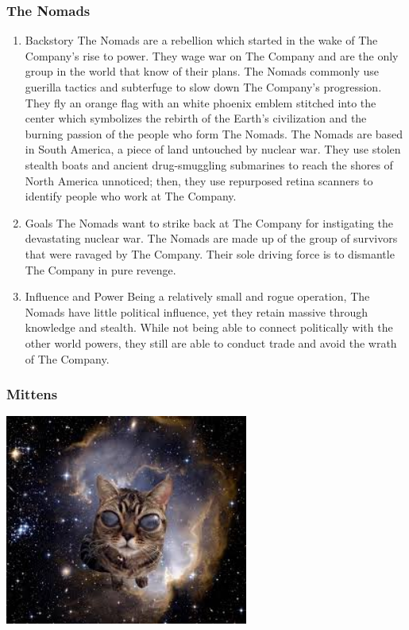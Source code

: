 \documentclass[11pt]{article}
\begin{document}
\subsubsection{The Nomads}
\label{sec:org3c369f0}

\begin{enumerate}
\item Backstory
\label{sec:orgce18551}
The Nomads are a rebellion which started in the wake of The Company's rise to power. They wage war on The Company and are the only group in the world that know of their plans. The Nomads commonly use guerilla tactics and subterfuge to slow down The Company's progression. They fly an orange flag with an white phoenix emblem stitched into the center which symbolizes the rebirth of the Earth's civilization and the burning passion of the people who form The Nomads. The Nomads are based in South America, a piece of land untouched by nuclear war. They use stolen stealth boats and ancient drug-smuggling submarines to reach the shores of North America unnoticed; then, they use repurposed retina scanners to identify people who work at The Company.

\item Goals
\label{sec:org41f2be7}
The Nomads want to strike back at The Company for instigating the devastating nuclear war. The Nomads are made up of the group of survivors that were ravaged by The Company. Their sole driving force is to dismantle The Company in pure revenge.

\item Influence and Power
\label{sec:orgc87bc53}
Being a relatively small and rogue operation, The Nomads have little political influence, yet they retain massive through knowledge and stealth. While not being able to connect politically with the other world powers, they still are able to conduct trade and avoid the wrath of The Company.
\end{enumerate}

\subsubsection{Mittens}
\label{sec:org13dc7fc}
\begin{center}
\includegraphics[width=8cm]{./img/mittens.png}
\end{center}
\end{document}
